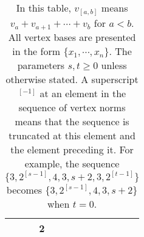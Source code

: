 \begin{table}
{\begin{adjustbox}{max width=\textwidth}
\begin{tabular}{@{}llll@{}}
	   	 &  {\bf 2} \\ 
		
\bottomrule
\end{tabular}%

\end{adjustbox}
}
\caption*{\small In this table, $v_{[a,b]}$ means $v_a+v_{a+1}+\cdots+v_{b}$ for $a<b$. All vertex bases are presented in the form $\{x_1,\cdots,x_n \}$. The parameters $s,t\ge0$ unless otherwise stated.
A superscript $^{[-1]}$ at an element in the sequence of vertex norms means that the sequence is truncated at this element and the element preceding it. For example, the sequence $\{3,2^{[s-1]},4,3,s+2,3,2^{[t-1]}\}$ becomes $\{3,2^{[s-1]},4,3,s+2\}$ when $t=0$.}
\end{table}	
\clearpage